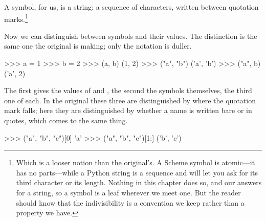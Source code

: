 A symbol, for us, is a string: a sequence of characters, written between
quotation marks.\footnote{Which is a looser notion than the original's.  A
Scheme symbol is atomic---it has no parts---while a Python string is a sequence
and will let you ask for its third character or its length.  Nothing in this
chapter does so, and our  answers  for a string, so
a symbol is a leaf wherever we meet one.  But the reader should know that the
indivisibility is a convention we keep rather than a property we have.}

Now we can distinguish between symbols and their values.  The distinction is
the same one the original is making; only the notation is duller.

\begin{codeBlock}
>>> a = 1
>>> b = 2
>>> (a, b)
(1, 2)
>>> ("a", "b")
('a', 'b')
>>> ("a", b)
('a', 2)
\end{codeBlock}

\noindent
The first gives the values of  and , the second the symbols
themselves, the third one of each.  In the original these three are
distinguished by where the quotation mark falls; here they are distinguished by
whether a name is written bare or in quotes, which comes to the same thing.

\begin{codeBlock}
>>> ("a", "b", "c")[0]
'a'
>>> ("a", "b", "c")[1:]
('b', 'c')
\end{codeBlock}

